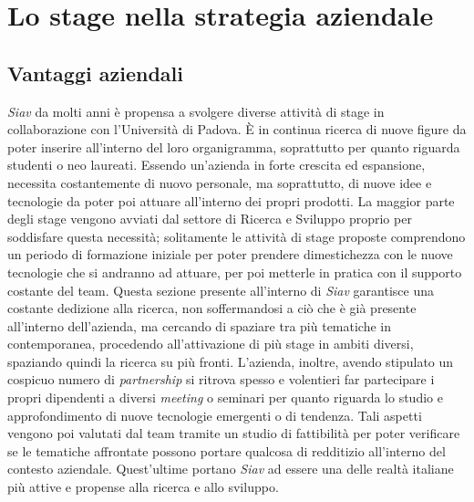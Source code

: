 
\chapter{Lo stage nella strategia aziendale}
\label{cap:stage interno della strategia aziendale}

\section{Vantaggi aziendali}
\textit{Siav} da molti anni è propensa a svolgere diverse attività di stage in collaborazione con l'Università di Padova. È in continua ricerca di nuove figure da poter inserire all'interno del loro organigramma, soprattutto per quanto riguarda studenti o neo laureati.  Essendo un'azienda in forte crescita ed espansione, necessita costantemente di nuovo personale, ma soprattutto, di nuove idee e tecnologie da poter poi attuare all'interno dei propri prodotti. La maggior parte degli stage vengono avviati dal settore di Ricerca e Sviluppo proprio per soddisfare questa necessità; solitamente le attività di stage proposte comprendono un periodo di formazione iniziale per poter prendere dimestichezza con le nuove tecnologie che si andranno ad attuare, per poi metterle in pratica con il supporto costante del team. Questa sezione presente all'interno di \textit{Siav} garantisce una costante dedizione alla ricerca, non soffermandosi a ciò che è già presente all'interno dell'azienda, ma cercando di spaziare tra più tematiche in contemporanea, procedendo all'attivazione di più stage in ambiti diversi, spaziando quindi la ricerca su più fronti. L'azienda, inoltre, avendo stipulato un cospicuo numero di \textit{partnership} si ritrova spesso e volentieri far partecipare i propri dipendenti a diversi \textit{meeting} o seminari per quanto riguarda lo studio e approfondimento di nuove tecnologie emergenti o di tendenza. Tali aspetti vengono poi valutati dal team tramite un studio di fattibilità per poter verificare se le tematiche affrontate possono portare qualcosa di redditizio all'interno del contesto aziendale. Quest'ultime portano \textit{Siav} ad essere una delle realtà italiane più attive e propense alla ricerca e allo sviluppo.
